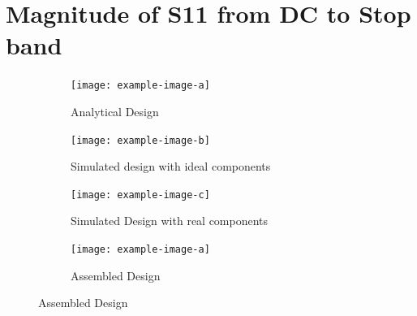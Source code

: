 \documentclass[letterpaper,12pt]{article}
\begin{document}
\section{Magnitude of S11 from DC to Stop band}
\begin{figure}[H]
    \begin{subfigure}[t]{.49\textwidth}
      \centering
      \texttt{[image: example-image-a]}
      \caption{Analytical Design}
    \end{subfigure}
    \hfill
    \begin{subfigure}[t]{.49\textwidth}
      \centering
      \texttt{[image: example-image-b]}
      \caption{Simulated design with ideal components}
    \end{subfigure}
  
    \medskip
  
    \begin{subfigure}[t]{.49\textwidth}
      \centering
      \texttt{[image: example-image-c]}
      \caption{Simulated Design with real components}
    \end{subfigure}
    \hfill
    \begin{subfigure}[t]{.49\textwidth}
      \centering
      \texttt{[image: example-image-a]}
      \caption{Assembled Design}
    \end{subfigure}
  \end{figure}

\newpage
\end{document}

